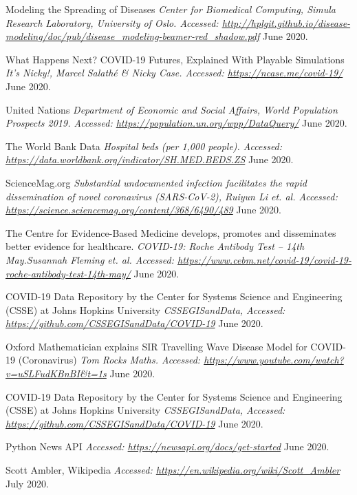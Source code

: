 \begin{thebibliography}{1}
 Modeling the Spreading of Diseases {\em Center for Biomedical Computing, Simula Research Laboratory, University of Oslo. Accessed:  \url{http://hplgit.github.io/disease-modeling/doc/pub/disease_modeling-beamer-red_shadow.pdf}} June 2020.

 What Happens Next? COVID-19 Futures, Explained With Playable Simulations {\em It's Nicky!, Marcel Salathé & Nicky Case. Accessed:  \url{https://ncase.me/covid-19/}} June 2020.

 United Nations {\em Department of Economic and Social Affairs, World Population Prospects 2019. Accessed:  \url{https://population.un.org/wpp/DataQuery/}} June 2020.

 The World Bank Data {\em Hospital beds (per 1,000 people). Accessed:  \url{https://data.worldbank.org/indicator/SH.MED.BEDS.ZS}} June 2020.

 ScienceMag.org {\em Substantial undocumented infection facilitates the rapid dissemination of novel coronavirus (SARS-CoV-2), Ruiyun Li et. al. Accessed:  \url{https://science.sciencemag.org/content/368/6490/489}} June 2020.

 The Centre for Evidence-Based Medicine develops, promotes and disseminates better evidence for healthcare. {\em COVID-19: Roche Antibody Test – 14th May.Susannah Fleming et. al. Accessed:  \url{https://www.cebm.net/covid-19/covid-19-roche-antibody-test-14th-may/}} June 2020.

 COVID-19 Data Repository by the Center for Systems Science and Engineering (CSSE) at Johns Hopkins University {\em CSSEGISandData, Accessed:  \url{https://github.com/CSSEGISandData/COVID-19}} June 2020.

 Oxford Mathematician explains SIR Travelling Wave Disease Model for COVID-19 (Coronavirus) {\em Tom Rocks Maths. Accessed:  \url{https://www.youtube.com/watch?v=uSLFudKBnBI&t=1s}} June 2020.

 COVID-19 Data Repository by the Center for Systems Science and Engineering (CSSE) at Johns Hopkins University {\em CSSEGISandData, Accessed:  \url{https://github.com/CSSEGISandData/COVID-19}} June 2020.

 Python News API {\em Accessed:  \url{https://newsapi.org/docs/get-started}} June 2020.

 Scott Ambler, Wikipedia {\em Accessed:  \url{https://en.wikipedia.org/wiki/Scott_Ambler}} July 2020.


\end{thebibliography}
